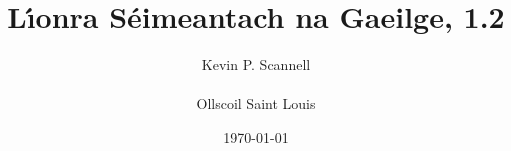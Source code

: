 \documentclass[8pt,twocolumn,openany]{extbook}
\begin{document}
\begin{frontmatter}
\title{\Huge\bf L\'{\i}onra S\'eimeantach na Gaeilge,
1.2} %
\author{{\Large Kevin P. Scannell}\\ \\ {\Large Ollscoil Saint Louis}}
\date{\today}
\maketitle
\onecolumn

\end{frontmatter}

\begin{mainmatter}
\twocolumn
\lhead{\large\bf \rightmark}
\rhead{\large\bf \leftmark}

\appendix
\lhead{}
\rhead{}

\end{mainmatter}

\begin{backmatter}
\onecolumn


%

\end{backmatter}
\end{document}

